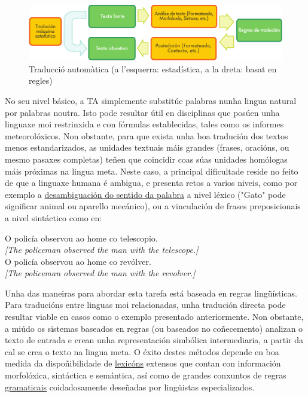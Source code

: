 \begin{multicols}{2}
\begin{figure}[htb]
  \vspace{-21mm}
  \center
  \includegraphics[width=\textwidth]{../_media/galician/machine_translation}
  \vspace{-2mm}
  \caption{Traducció automàtica (a l'esquerra: estadística, a la dreta: basat en regles)}
  \label{fig:mtarch_ca}
\end{figure}

No seu nivel básico, a TA simplemente substitúe palabras nunha lingua natural por palabras noutra. Isto pode resultar útil en disciplinas que posúen unha linguaxe moi restrinxida e con fórmulas establecidas, tales como os informes meteorolóxicos. Non obstante, para que exista unha boa tradución dos textos menos estandarizados, as unidades textuais máis grandes (frases, oracións, ou mesmo pasaxes completas) teñen que coincidir coas súas unidades homólogas máis próximas na lingua meta. Neste caso, a principal dificultade reside no feito de que a linguaxe humana é ambigua, e presenta retos a varios niveis, como por exemplo a \uline{desambiguación do sentido da palabra} a nivel léxico ("Gato" pode significar animal ou aparello mecánico), ou a vinculación de frases preposicionais a nivel sintáctico como en:

\hspace{10pt}O policía observou ao home co telescopio.\\
\hspace{10pt}\textit{[The policeman observed the man with the telescope.]}\\
\hspace{10pt}O policía observou ao home co revólver.\\
\hspace{10pt}\textit{[The policeman observed the man with the revolver.]}

Unha das maneiras para abordar esta tarefa está baseada en regras lingüísticas. Para traducións entre linguas moi relacionadas, unha tradución directa pode resultar viable en casos como o exemplo presentado anteriormente. Non obstante, a miúdo os sistemas baseados en regras (ou baseados no coñecemento) analizan o texto de entrada e crean unha representación simbólica intermediaria, a partir da cal se crea o texto na lingua meta. O éxito destes métodos depende en boa medida da dispoñibilidade de \uline{lexicóns} extensos que contan con información morfolóxica, sintáctica e semántica, así como de grandes conxuntos de regras \uline{gramaticais} coidadosamente deseñadas por lingüistas especializados.


\end{multicols}
